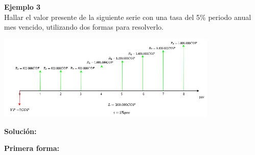 \textbf{Ejemplo 3}\\
Hallar el valor presente de la siguiente serie con una tasa del 5\% periodo anual mes vencido, utilizando dos formas para resolverlo.\\

\begin{center}
	\includegraphics[height=4.0cm]{6_Capitulo/img/ejemplos/6_5}
\end{center}

\textbf{Solución:}

\begin{center}
	\textbf{Primera forma:}
\end{center}

